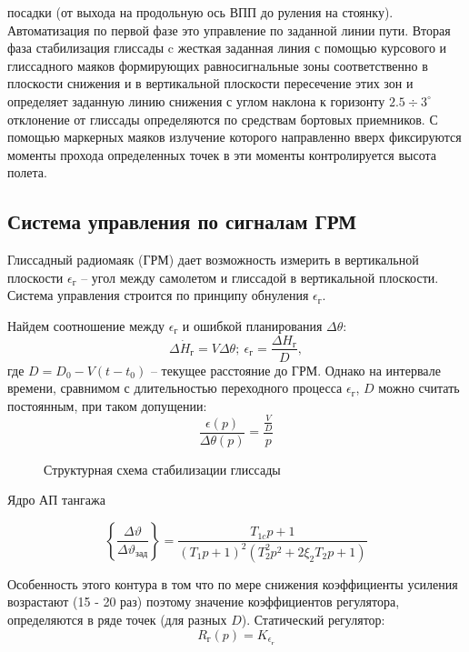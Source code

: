 \documentclass{article}
\begin{document}
посадки (от выхода на продольную ось ВПП до руления на стоянку).
Автоматизация по первой фазе это управление по заданной линии пути. Вторая фаза
стабилизация глиссады c жесткая заданная линия с помощью курсового и
глиссадного маяков формирующих равносигнальные зоны соответственно в плоскости
снижения и в вертикальной плоскости пересечение этих зон и определяет заданную
линию снижения с углом наклона к горизонту $2.5 \div 3^\circ$ отклонение от
глиссады определяются по средствам бортовых приемников.
С помощью маркерных маяков излучение которого направленно вверх фиксируются
моменты прохода определенных точек в эти моменты контролируется высота полета.
\begin{figure}[H]
	\centering
	\label{fig:fig_66}
\end{figure}

\subsection{Система управления по сигналам ГРМ}
Глиссадный радиомаяк (ГРМ) дает возможность измерить в вертикальной плоскости
$\epsilon_\text{г}$  -- угол между самолетом и глиссадой в вертикальной
плоскости. Система управления строится по принципу обнуления
$\epsilon_\text{г}$.
\begin{figure}[H]
	\centering
	\label{fig:fig_67}
\end{figure}

Найдем соотношение между $\epsilon_\text{г}$ и ошибкой планирования $\Delta
	\theta$:
\[
	\Delta \dot{H}_{\text{г}} = V \Delta \theta; \ \epsilon_\text{г} =
	\frac{\Delta H_\text{г}}{D},
\]
где $D = D_0 - V(t-t_0)$ -- текущее расстояние до ГРМ.
Однако на интервале времени, сравнимом с длительностью переходного процесса
$\epsilon_\text{г}$, $D$ можно считать постоянным, при таком допущении:
\[
	\frac{\epsilon(p)}{\Delta \theta(p)} = \frac{\frac{V}{D}}{p}
\]

\begin{figure}[H]
	\centering
	\caption{Структурная схема стабилизации глиссады}
	\label{fig:fig_68}
\end{figure}
Ядро АП тангажа

\[
	\left\{ \frac{\Delta \vartheta}{\Delta \vartheta_\text{зад}} \right\}  =
	\frac{T_{1c}p + 1}{(T_{1}p + 1)^2 ( T_2^2p^2 + 2 \xi_2 T_2 p + 1 )}
\]


Особенность этого контура в том что по мере снижения коэффициенты усиления
возрастают (15 - 20 раз) поэтому значение коэффициентов регулятора,
определяются в ряде точек (для разных $D$).
Статический регулятор:
\[
	R_\text{г}(p) = K_{\epsilon_\text{г}}
\]
\end{document}
